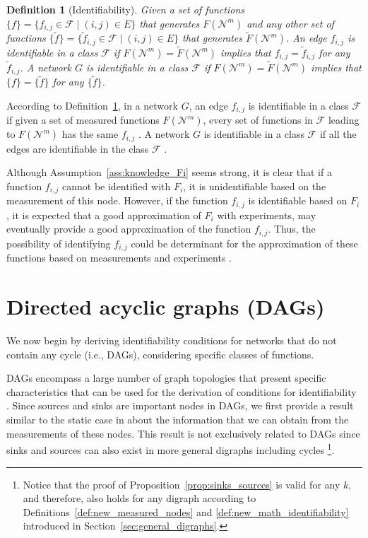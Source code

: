 \documentclass[letterpaper,10pt,journal]{IEEEtran}
\newcommand{\F}{\mathcal{F}}
\newtheorem{definition}{Definition}
\newcommand{\NN}{\mathcal{N}}
\begin{document}
\begin{definition}[Identifiability]\label{def:math_identifiability}
    Given a set of functions $\{ f \}=\{f_{i,j}\in \F\;|\;(i,j)\in E\}$ that generates $F(\NN^m)$ and any other set of functions $\{ \tilde f \}=\{\tilde f_{i,j}\in\F\;|\;(i,j)\in E\}$ that generates $\tilde F(\NN^m)$. An edge $f_{i,j}$ is identifiable in a class $\F$ if $
    F(\NN^m)=\tilde F(\NN^m)
    $ implies that $f_{i,j}=\tilde f_{i,j}$ for any $\tilde f_{i,j}$.
    A network $G$ is identifiable in a class $\F$ if 
    $
    F(\NN^m)=\tilde F(\NN^m)
    $
    implies that
    $
    \{ f \}=\{ \tilde f \}
    $ for any $\{ \tilde f \}$.
\end{definition}

According to Definition~\ref{def:math_identifiability}, in a network $G$, an edge $f_{i,j}$ is identifiable in a class $\F$ if given a set of measured functions $F(\mathcal{N}^m)$, every set of functions in $\F$ leading to $F(\mathcal{N}^m)$ has the same $f_{i,j}$ \cite{vizuete2023nonlinear}. A network $G$ is identifiable in a class $\F$ if all the edges are identifiable in the \linebreak class $\F$ \cite{vizuete2023nonlinear}.




Although Assumption~\ref{ass:knowledge_Fi} seems strong, it is clear that if a function $f_{i,j}$ cannot be identified with $F_i$, it is unidentifiable based on the measurement of this node. However, if the function $f_{i,j}$ is identifiable based on $F_i$, it is expected that a good approximation of $F_i$ with experiments, may eventually provide a good approximation of the function $f_{i,j}$. Thus, the possibility of identifying $f_{i,j}$ could be determinant for the approximation of these functions based on measurements and experiments \cite{ljung1999system}.





\section{Directed acyclic graphs (DAGs)}\label{sec:DAG}

We now begin by deriving identifiability conditions  for networks that do not contain any cycle (i.e., DAGs), considering specific classes of functions. 


DAGs encompass a large number of graph topologies that present specific characteristics that can be used for the derivation of conditions for identifiability \cite{cheng2024identifiability,mapurunga2022excitation}. Since sources and sinks are important nodes in DAGs, we first provide a result similar to the static case in \cite{vizuete2023nonlinear} about the information that we can obtain from the measurements of these nodes. This result is not exclusively related to DAGs since sinks and sources can also exist in more general digraphs including cycles \footnote{Notice that the proof of Proposition~\ref{prop:sinks_sources} is valid for any $k$, and therefore, also holds for any digraph according to Definitions~\ref{def:new_measured_nodes} and \ref{def:new_math_identifiability} introduced in Section~\ref{sec:general_digraphs}.}. 
\end{document}

